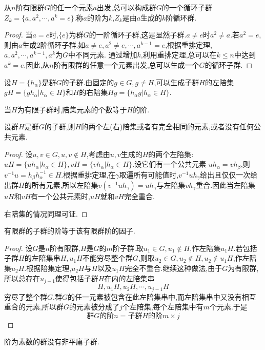 从$n$阶有限群$G$的任一个元素$a$出发,总可以构成群$G$的一个循环子群$Z_k=\{a,a^2,\cdots,a^k=e\}$.称$a$的阶为$k$,$Z_k$是由$a$生成的$k$阶循环群.
\begin{proof}
当$a=e$时,$\{e\}$为群$G$的一阶循环子群,这是显然子群.$a\neq e$时$a^2\neq a$.若$a^2=e$,则由$a$生成2阶循环子群.如$a\neq e,a^2 \neq e,\cdots,a^{k-1}=e$,根据重排定理,$a,a^2,\cdots,a^{k-1},a^k$为$G$中不同元素. 通过增加$k$,利用重排定理,总可以在$k\leqslant n$中达到$a^k=e$.因此,从$n$阶有限群的任意一个元素出发,总可以生成一个$G$的循环子群.
\end{proof}
\begin{definition}[陪集(旁集)]
    设$H=\{h_\alpha\}$是群$G$的子群.由固定的$g \in G,g\neq H$,可以生成子群$H$的左陪集$gH=\{gh_\alpha|h_\alpha \in H\}$和$H$的右陪集$Hg=\{h_\alpha g|h_\alpha\in H\}$.
\end{definition}
当$H$为有限子群时,陪集元素的个数等于$H$的阶.
\begin{theorem}[陪集定理]
    设群$H$是群$G$的子群,则$H$的两个左(右)陪集或者有完全相同的元素,或者没有任何公共元素.
\end{theorem}
\begin{proof}
设$u,v\in G,u,v\notin H$,考虑由$u,v$生成的$H$的两个左陪集:$uH=\{uh_\alpha|h_\alpha \in H\},vH=\{vh_\alpha |h_\alpha \in H\}$.设它们有一个公共元素
$uh_\alpha=vh_\beta$,则$v^{-1}u=h_\beta h_\alpha^{-1}\in H$.根据重排定理,在$\gamma$取遍所有可能值时,$v^{-1}uh_\gamma$给出且仅仅一次给出群$H$的所有元素,所以左陪集$v(v^{-1}uh_\gamma)=uh_\gamma$与左陪集$vh_\gamma$重合.因此当左陪集$uH$和$vH$有一个公共元素时,$uH$就和$vH$完全重合.

右陪集的情况同理可证.
\end{proof}
\begin{theorem}[Lagrange定理]
    有限群的子群的阶等于该有限群阶的因子.
\end{theorem}
\begin{proof}
设$G$是$n$阶有限群,$H$是$G$的$m$阶子群.取$u_1 \in G,u_1\notin H$,作左陪集$u_1H$.若包括子群$H$的左陪集串$H,u_1H$不能穷尽整个群$G$,则取$u_2 \in G,u_2 \notin H,u_2\notin u_1H$,作左陪集$u_2H$.根据陪集定理,$u_2H$与$H$以及$u_1H$完全不重合.继续这种做法,由于$G$为有限群,所以总存在$u_{j-1}$使得包括子群$H$在内的左陪集串
$$H,u_1H,u_2H,\cdots,u_{j-1}H$$
穷尽了整个群$G$.群$G$的任一元素被包含在此左陪集串中,而左陪集串中又没有相互重合的元素,所以群$G$的元素被分成了$j$个左陪集,每个左陪集中有$m$个元素.于是
$$\text{群}G\text{的阶}n=\text{子群}H\text{的阶} m \times j$$
\end{proof}
\begin{corollary}
    阶为素数的群没有非平庸子群.
\end{corollary}
